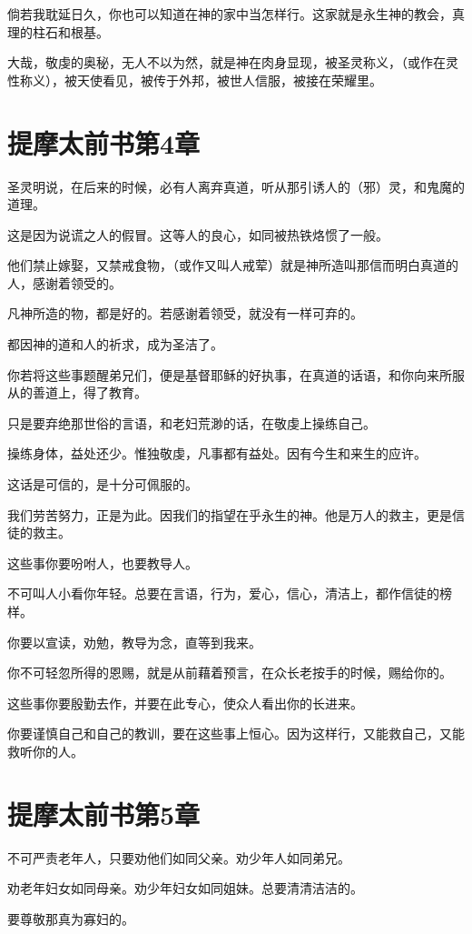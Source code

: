 \documentclass[12pt,oneside]{book}
\begin{document}
倘若我耽延日久，你也可以知道在神的家中当怎样行。这家就是永生神的教会，真理的柱石和根基。

大哉，敬虔的奥秘，无人不以为然，就是神在肉身显现，被圣灵称义，（或作在灵性称义），被天使看见，被传于外邦，被世人信服，被接在荣耀里。

\chapter{提摩太前书第4章}
圣灵明说，在后来的时候，必有人离弃真道，听从那引诱人的（邪）灵，和鬼魔的道理。

这是因为说谎之人的假冒。这等人的良心，如同被热铁烙惯了一般。

他们禁止嫁娶，又禁戒食物，（或作又叫人戒荤）就是神所造叫那信而明白真道的人，感谢着领受的。

凡神所造的物，都是好的。若感谢着领受，就没有一样可弃的。

都因神的道和人的祈求，成为圣洁了。

你若将这些事题醒弟兄们，便是基督耶稣的好执事，在真道的话语，和你向来所服从的善道上，得了教育。

只是要弃绝那世俗的言语，和老妇荒渺的话，在敬虔上操练自己。

操练身体，益处还少。惟独敬虔，凡事都有益处。因有今生和来生的应许。

这话是可信的，是十分可佩服的。

我们劳苦努力，正是为此。因我们的指望在乎永生的神。他是万人的救主，更是信徒的救主。

这些事你要吩咐人，也要教导人。

不可叫人小看你年轻。总要在言语，行为，爱心，信心，清洁上，都作信徒的榜样。

你要以宣读，劝勉，教导为念，直等到我来。

你不可轻忽所得的恩赐，就是从前藉着预言，在众长老按手的时候，赐给你的。

这些事你要殷勤去作，并要在此专心，使众人看出你的长进来。

你要谨慎自己和自己的教训，要在这些事上恒心。因为这样行，又能救自己，又能救听你的人。

\chapter{提摩太前书第5章}
不可严责老年人，只要劝他们如同父亲。劝少年人如同弟兄。

劝老年妇女如同母亲。劝少年妇女如同姐妹。总要清清洁洁的。

要尊敬那真为寡妇的。
\end{document}
